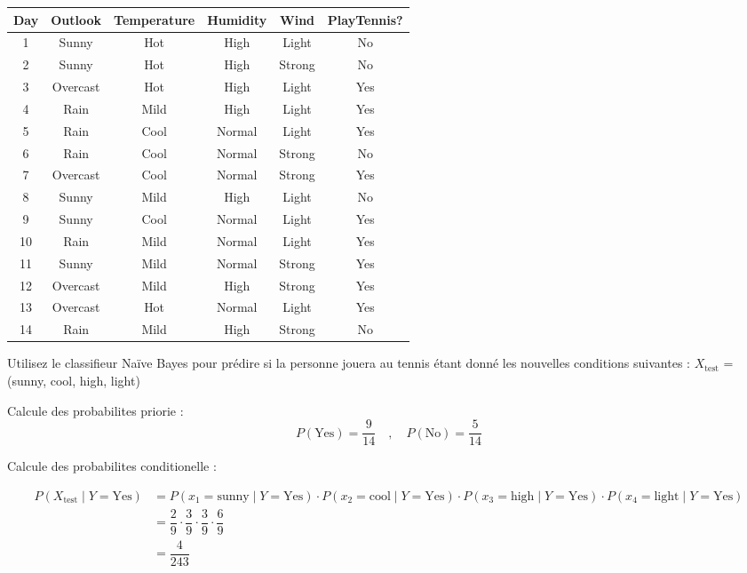 \documentclass{article}
\begin{document}
\begin{table}[h]
\centering

\renewcommand{\arraystretch}{1.75} 
\setlength{\tabcolsep}{12pt}      

\begin{tabular}{|c|c|c|c|c|c|} 

\hline
\textbf{Day}  & \textbf{Outlook}  & \textbf{Temperature} & \textbf{Humidity} & \textbf{Wind} & \textbf{PlayTennis?} \\ \hline
1& Sunny& Hot& High &Light & No \\ \hline
2& Sunny &Hot &High &Strong& No \\ \hline
3 &Overcast &Hot &High &Light &Yes \\ \hline
4 &Rain &Mild &High &Light &Yes \\ \hline
5 &Rain &Cool &Normal &Light &Yes \\ \hline
6 &Rain &Cool &Normal &Strong &No \\ \hline
7 &Overcast &Cool &Normal &Strong &Yes \\ \hline
8 &Sunny &Mild &High &Light &No \\ \hline
9 &Sunny &Cool &Normal &Light &Yes \\ \hline
10 &Rain &Mild &Normal &Light &Yes \\ \hline
11 &Sunny &Mild &Normal &Strong &Yes\\ \hline
12 &Overcast &Mild &High &Strong &Yes \\ \hline
13 &Overcast& Hot& Normal &Light& Yes\\ \hline
14 &Rain &Mild &High& Strong& No \\ \hline
\end{tabular}
\end{table}

Utilisez le classifieur Naïve Bayes pour prédire si la personne jouera au tennis étant donné
les nouvelles conditions suivantes : $X_{\text{test}}$ = (sunny, cool, high, light) 

\vspace{0.75cm}
Calcule des probabilites priorie :
\[P(\text{Yes}) = \dfrac{9}{14} \quad , \quad P(\text{No}) = \dfrac{5}{14}\]


\vspace{0.75cm}
Calcule des probabilites conditionelle :

{\footnotesize
\begin{align*}
    P(X_{\text{test}} \mid Y = \text{Yes}) &= P(x_1 = \text{sunny} \mid Y =\text{Yes}) \cdot P(x_2 = \text{cool} \mid Y =\text{Yes}) \cdot P(x_3 = \text{high} \mid Y =\text{Yes}) \cdot P(x_4 = \text{light} \mid Y =\text{Yes})  \\[0.15cm] 
                                           & = \dfrac{2}{9} \cdot \dfrac{3}{9} \cdot \dfrac{3}{9} \cdot \dfrac{6}{9} \\[0.15cm]
                                           & = \dfrac{4}{243}
\end{align*}
}
\end{document}
